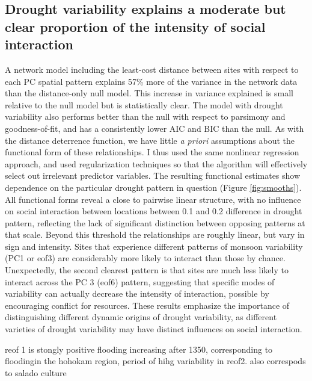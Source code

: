 \documentclass[11pt]{wlscirep}
\begin{document}
\subsection*{Drought variability explains a moderate but clear proportion of the intensity of social interaction}
A network model including the least-cost distance between sites with respect to each PC spatial pattern explains 57\% more of the variance in the network data than the distance-only null model. This increase in variance explained is small relative to the null model but is statistically clear. The model with drought variability also performs better than the null with respect to parsimony and goodness-of-fit, and has a consistently lower AIC and BIC than the null. As with the distance deterrence function, we have little \textit{a priori} assumptions about the functional form of these relationships. I thus used the same nonlinear regression approach, and used regularization techniques so that the algorithm will effectively select out irrelevant predictor variables. The resulting functional estimates show dependence on the particular drought pattern in question (Figure \ref{fig:smooths}). All functional forms reveal a close to pairwise linear structure, with no influence on social interaction between locations between 0.1 and 0.2 difference in drought pattern, reflecting the lack of significant distinction between opposing patterns at that scale. Beyond this threshold the relationships are roughly linear, but vary in sign and intensity. Sites that experience different patterns of monsoon variability (PC1 or eof3) are considerably more likely to interact than those by chance. Unexpectedly, the second clearest pattern is that sites are much less likely to interact across the PC 3 (eof6) pattern, suggesting that specific modes of variability can actually decrease the intensity of interaction, possible by encouraging conflict for resources. These results emphasize the importance of distinguishing different dynamic origins of drought variability, as different varieties of drought variability may have distinct influences on social interaction.


reof 1 is stongly positive flooding increasing after 1350, corresponding to floodingin the hohokam region, period of hihg variability in reof2. also correspods to salado culture
\end{document}
